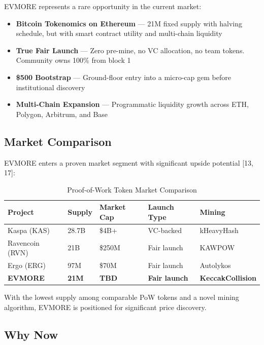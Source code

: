 \documentclass[11pt,a4paper]{article}
\begin{document}
EVMORE represents a rare opportunity in the current market:

\begin{itemize}
    \item \textbf{Bitcoin Tokenomics on Ethereum} --- 21M fixed supply with halving schedule, but with smart contract utility and multi-chain liquidity
    \item \textbf{True Fair Launch} --- Zero pre-mine, no VC allocation, no team tokens. Community owns 100\% from block 1
    \item \textbf{\$500 Bootstrap} --- Ground-floor entry into a micro-cap gem before institutional discovery
    \item \textbf{Multi-Chain Expansion} --- Programmatic liquidity growth across ETH, Polygon, Arbitrum, and Base
\end{itemize}

\subsection{Market Comparison}

EVMORE enters a proven market segment with significant upside potential [13, 17]:

\begin{table}[h]
\centering
\begin{tabular}{@{}lllll@{}}
\toprule
\textbf{Project} & \textbf{Supply} & \textbf{Market Cap} & \textbf{Launch Type} & \textbf{Mining} \\
\midrule
Kaspa (KAS) & 28.7B & \$4B+ & VC-backed & kHeavyHash \\
Ravencoin (RVN) & 21B & \$250M & Fair launch & KAWPOW \\
Ergo (ERG) & 97M & \$70M & Fair launch & Autolykos \\
\textbf{EVMORE} & \textbf{21M} & \textbf{TBD} & \textbf{Fair launch} & \textbf{KeccakCollision} \\
\bottomrule
\end{tabular}
\caption{Proof-of-Work Token Market Comparison}
\end{table}

\noindent With the lowest supply among comparable PoW tokens and a novel mining algorithm, EVMORE is positioned for significant price discovery.

\subsection{Why Now}
\end{document}

